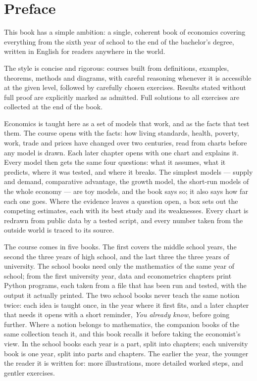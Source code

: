 \chapter{Preface}

This book has a simple ambition: a single, coherent book of economics
covering everything from the sixth year of school to the end of the
bachelor's degree, written in English for readers anywhere in the world.

The style is concise and rigorous: courses built from definitions, examples,
theorems, methods and diagrams, with careful reasoning whenever it is
accessible at the given level, followed by carefully chosen exercises.
Results stated without full proof are explicitly marked as admitted. Full
solutions to all exercises are collected at the end of the book.

Economics is taught here as a set of models that work, and as the facts that
test them. The course opens with the facts: how living standards, health,
poverty, work, trade and prices have changed over two centuries, read from
charts before any model is drawn. Each later chapter opens with one chart and
explains it. Every model then gets the same four questions: what it assumes,
what it predicts, where it was tested, and where it breaks. The simplest
models --- supply and demand, comparative advantage, the growth model, the
short-run models of the whole economy --- are toy models, and the book says
so; it also says how far each one goes. Where the evidence leaves a question
open, a box sets out the competing estimates, each with its best study and its
weaknesses. Every chart is redrawn from public data by a tested script, and
every number taken from the outside world is traced to its source.

The course comes in five books. The first covers the middle school years,
the second the three years of high school, and the last three the three years
of university. The school books need only the mathematics of the same year of
school; from the first university year, data and econometrics chapters print
Python programs, each taken from a file that has been run and tested, with the
output it actually printed. The two school books never teach the same notion
twice: each idea is taught once, in the year where it first fits, and a later
chapter that needs it opens with a short reminder, \emph{You already know},
before going further. Where a notion belongs to mathematics, the companion
books of the same collection teach it, and this book recalls it before taking
the economist's view. In the school books each year is a part, split into
chapters; each university book is one year, split into parts and chapters.
The earlier the year, the younger the reader it is written for: more
illustrations, more detailed worked steps, and gentler exercises.

